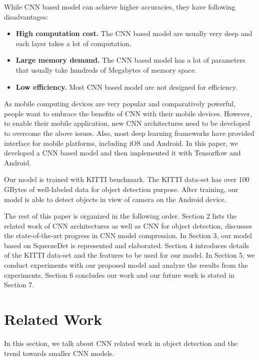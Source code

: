 \documentclass[10pt,twocolumn,letterpaper]{article}
\begin{document}
While CNN based model can achieve higher accuracies, they have following disadvantages:

\begin{itemize}
    \item \textbf{High computation cost. } The CNN based model are usually very deep and each layer takes a lot of computation.
    \item \textbf{Large memory demand. } The CNN based model has a lot of parameters that usually take hundreds of Megabytes of memory space.
    \item \textbf{Low efficiency. } Most CNN based model are not designed for efficiency.
\end{itemize}

As mobile computing devices are very popular and comparatively powerful, people want to embrace the benefits of CNN with their mobile devices. However, to enable their mobile application,
new CNN architectures need to be developed to overcome the above issues.
Also, most deep learning frameworks have provided interface for mobile platforms, including iOS and Android. In this paper, we developed a CNN based model and then implemented it with Tensorflow and Android.


Our model is trained with KITTI benchmark. The KITTI data-set has over 100 GBytes of well-labeled data for object detection purpose. After training, our model is able to detect objects in view of camera on the Android device.

The rest of this paper is organized in the following order. Section 2 lists the related work of CNN architectures as well as CNN for object detection, discusses the state-of-the-art progress in CNN model compression. In Section 3, our model based on SqueezeDet is represented and elaborated. Section 4 introduces details of the KITTI data-set and the features to be used for our model. In Section 5, we conduct experiments with our proposed model and analyze the results from the experiments. Section 6 concludes our work and our future work is stated in Section 7.



\section{Related Work}
In this section, we talk about CNN related work in object detection and the trend towards smaller CNN models.
\end{document}
